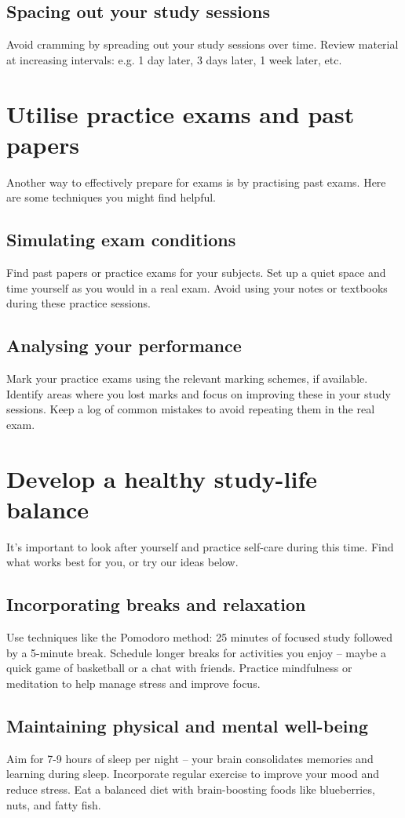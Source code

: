 \documentclass[a4paper]{article}
\begin{document}
\subsection{Spacing out your study sessions}
Avoid cramming by spreading out your study sessions over time.
Review material at increasing intervals: e.g. 1 day later, 3 days later, 1 week later, etc.\\


\section{Utilise practice exams and past papers}
Another way to effectively prepare for exams is by practising past exams. Here are some techniques you might find helpful.

\subsection{Simulating exam conditions}
Find past papers or practice exams for your subjects.
Set up a quiet space and time yourself as you would in a real exam.
Avoid using your notes or textbooks during these practice sessions.
\subsection{Analysing your performance}
Mark your practice exams using the relevant marking schemes, if available.
Identify areas where you lost marks and focus on improving these in your study sessions.
Keep a log of common mistakes to avoid repeating them in the real exam.\\

\section{Develop a healthy study-life balance}
It's important to look after yourself and practice self-care during this time. Find what works best for you, or try our ideas below.

\subsection{Incorporating breaks and relaxation}
Use techniques like the Pomodoro method: 25 minutes of focused study followed by a 5-minute break.
Schedule longer breaks for activities you enjoy – maybe a quick game of basketball or a chat with friends.
Practice mindfulness or meditation to help manage stress and improve focus.
\subsection{Maintaining physical and mental well-being}
Aim for 7-9 hours of sleep per night – your brain consolidates memories and learning during sleep.
Incorporate regular exercise to improve your mood and reduce stress.
Eat a balanced diet with brain-boosting foods like blueberries, nuts, and fatty fish.\\
\end{document}
